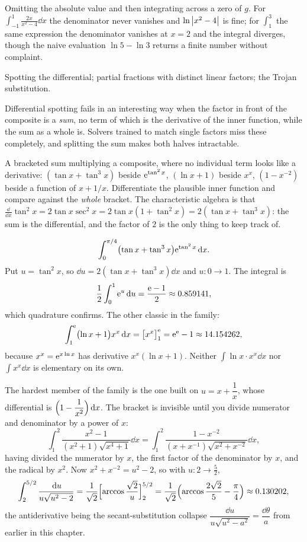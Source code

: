 \begin{trap}
Omitting the absolute value and then integrating across a zero of $g$. For $\int_{-1}^{1}\frac{2x}{x^2-4}\dd x$ the denominator never vanishes and $\ln\left\lvert x^2-4\right\rvert$ is fine; for $\int_1^3$ the same expression the denominator vanishes at $x=2$ and the integral diverges, though the naive evaluation $\ln5-\ln3$ returns a finite number without complaint.
\end{trap}

\begin{seealsob}Spotting the differential; partial fractions with distinct linear factors; the Trojan substitution.\end{seealsob}

Differential spotting fails in an interesting way when the factor in front of the composite is a \emph{sum}, no term of which is the derivative of the inner function, while the sum as a whole is. Solvers trained to match single factors miss these completely, and splitting the sum makes both halves intractable.

\cue A bracketed sum multiplying a composite, where no individual term looks like a derivative: $(\tan x+\tan^3x)$ beside $\mathrm{e}^{\tan^2x}$, $(\ln x+1)$ beside $x^x$, $(1-x^{-2})$ beside a function of $x+1/x$.
\method Differentiate the plausible inner function and compare against the \emph{whole} bracket. The characteristic algebra is that $\tfrac{\dd}{\dd x}\tan^2x=2\tan x\sec^2x=2\tan x(1+\tan^2x)=2(\tan x+\tan^3x)$: the sum is the differential, and the factor of $2$ is the only thing to keep track of.

\begin{worked}
\[
\int_0^{\pi/4}\bigl(\tan x+\tan^3x\bigr)\mathrm{e}^{\tan^2x}\,\mathrm{d} x .
\]
Put $u=\tan^2x$, so $\dd u=2(\tan x+\tan^3x)\dd x$ and $u:0\to1$. The integral is
\[
\frac12\int_0^1\mathrm{e}^u\,\mathrm{d} u=\frac{\mathrm{e}-1}{2}\approx0.859141 ,
\]
which quadrature confirms. The other classic in the family:
\[
\int_1^{\mathrm{e}}\bigl(\ln x+1\bigr)x^x\,\mathrm{d} x=\bigl[x^x\bigr]_1^{\mathrm{e}}=\mathrm{e}^{\mathrm{e}}-1\approx14.154262 ,
\]
because $x^x=\mathrm{e}^{x\ln x}$ has derivative $x^x(\ln x+1)$. Neither $\int\ln x\cdot x^x\dd x$ nor $\int x^x\dd x$ is elementary on its own.

The hardest member of the family is the one built on $u=x+\dfrac1x$, whose differential is $\Bigl(1-\dfrac{1}{x^2}\Bigr)\,\mathrm{d} x$. The bracket is invisible until you divide numerator and denominator by a power of $x$:
\[
\int_1^2\frac{x^2-1}{(x^2+1)\sqrt{x^4+1}}\dd x
=\int_1^2\frac{1-x^{-2}}{(x+x^{-1})\sqrt{x^2+x^{-2}}}\dd x ,
\]
having divided the numerator by $x$, the first factor of the denominator by $x$, and the radical by $x^2$. Now $x^2+x^{-2}=u^2-2$, so with $u:2\to\tfrac52$,
\[
\int_2^{5/2}\frac{\,\mathrm{d} u}{u\sqrt{u^2-2}}=\frac{1}{\sqrt2}\Bigl[\arccos\frac{\sqrt2}{u}\Bigr]_2^{5/2}
=\frac{1}{\sqrt2}\Bigl(\arccos\frac{2\sqrt2}{5}-\frac{\pi}{4}\Bigr)\approx0.130202 ,
\]
the antiderivative being the secant-substitution collapse $\dfrac{\dd u}{u\sqrt{u^2-a^2}}=\dfrac{\dd\theta}{a}$ from earlier in this chapter.
\end{worked}


